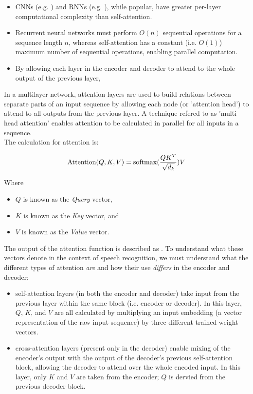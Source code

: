 \begin{itemize}
        \item CNNs (e.g. \cite{zeghidour2018fully}) and RNNs (e.g. \cite{graves2014towards}), while popular, have greater per-layer computational complexity than self-attention\cite{vaswani2017attention}.
        \item Recurrent neural networks must perform $O(n)$ sequential operations for a sequence length $n$, whereas self-attention has a constant (i.e. $O(1)$) maximum number of sequential operations, enabling parallel computation\cite{vaswani2017attention}.
        \item By allowing each layer in the encoder and decoder to attend to the whole output of the previous layer, 
\end{itemize}

In a multilayer network, attention layers are used to build relations between separate parts of an input sequence by allowing each node (or 'attention head'\cite{shaw2018self}) to attend to all outputs from the previous layer.
A technique refered to as 'multi-head attention'\cite{vaswani2017attention} enables attention to be calculated in parallel for all inputs in a sequence.\\

The calculation for attention is:

\[ \text{Attention}(Q,K,V) = \operatorname{softmax} (\frac{QK^T}{\sqrt{d_k}})V \]

Where

\begin{itemize}
        \item $Q$ is known as the \emph{Query} vector,
        \item $K$ is known as the \emph{Key} vector, and
        \item $V$ is known as the \emph{Value} vector.
\end{itemize}

The output of the attention function is described as \cite{vaswani2017attention}.
To understand what these vectors denote in the context of speech recognition, we must understand what the different types of attention \emph{are} and how their use \emph{differs} in the encoder and decoder;

\begin{itemize}
        \item self-attention layers (in both the encoder and decoder) take input from the previous layer within the same block (i.e. encoder or decoder).
        In this layer, $Q$, $K$, and $V$ are all calculated by multiplying an input embedding (a vector representation of the raw input sequence) by three different trained weight vectors.
        \item cross-attention layers (present only in the decoder) enable mixing of the encoder's output with the output of the decoder's previous self-attention block, allowing the decoder to attend over the whole encoded input.
        In this layer, only $K$ and $V$ are taken from the encoder; $Q$ is dervied from the previous decoder block.
\end{itemize}

